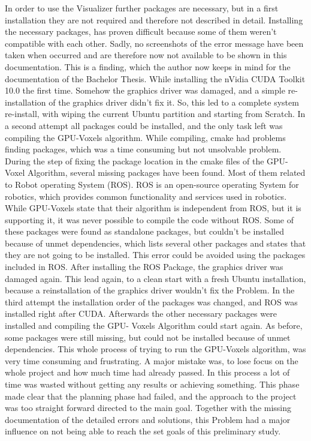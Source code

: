 In order to use the Visualizer further packages are necessary, but in a first installation they are not required and therefore not described in detail.
Installing the necessary packages, has proven difficult because some of them weren't compatible with each other. Sadly, no screenshots of the error message have been taken when occurred and are therefore now not available to be shown in this documentation. This is a finding, which the author now keeps in mind for the documentation of the Bachelor Thesis. 
While installing the nVidia CUDA Toolkit 10.0 the first time. Somehow the graphics driver was damaged, and a simple re-installation of the graphics driver didn't fix it. So, this led to a complete system re-install, with wiping the current Ubuntu partition and starting from Scratch.
In a second attempt all packages could be installed, and the only task left was compiling the GPU-Voxels algorithm. While compiling, cmake had problems finding packages, which was a time consuming but not unsolvable problem. During the step of fixing the package location in the cmake files of the GPU-Voxel Algorithm, several missing packages have been found. Most of them related to Robot operating System (ROS). ROS is an open-source operating System for robotics, which provides common functionality and services used in robotics. While GPU-Voxels state that their algorithm is independent from ROS, but it is supporting it, it was never possible to compile the code without ROS. Some of these packages were found as standalone packages, but couldn't be installed because of unmet dependencies, which lists several other packages and states that they are not going to be installed. This error could be avoided using the packages included in ROS. After installing the ROS Package, the graphics driver was damaged again. This lead again, to a clean start with a fresh Ubuntu installation, because a reinstallation of the graphics driver wouldn't fix the Problem.
In the third attempt the installation order of the packages was changed, and ROS was installed right after CUDA. Afterwards the other necessary packages were installed and compiling the GPU- Voxels Algorithm could start again. As before, some packages were still missing, but could not be installed because of unmet dependencies.
This whole process of trying to run the GPU-Voxels algorithm, was very time consuming and frustrating. A major mistake was, to lose focus on the whole project and how much time had already passed. In this process a lot of time was wasted without getting any results or achieving something. This phase made clear that the planning phase had failed, and the approach to the project was too straight forward directed to the main goal. Together with the missing documentation of the detailed errors and solutions, this Problem had a major influence on not being able to reach the set goals of this preliminary study.


